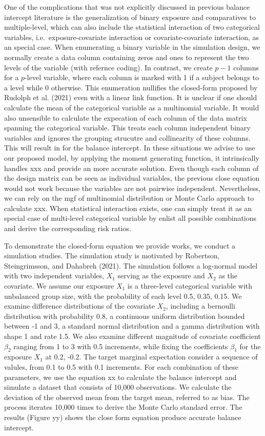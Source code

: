 \documentclass[
]{article}
\begin{document}
One of the complications that was not explicitly discussed in previous
balance intercept literature is the generalization of binary exposure
and comparatives to multiple-level, which can also include the
statistical interaction of two categorical variables,
i.e.~exposure-covariate interaction or covariate-covariate interaction,
as an special case. When enumerating a binary variable in the simulation
design, we normally create a data column containing zeros and ones to
represent the two levels of the variable (with refernce coding). In
contrast, we create \(p-1\) columns for a \(p\)-level variable, where
each column is marked with 1 if a subject belongs to a level while 0
otherwise. This enumeration nullifies the closed-form proposed by
Rudolph et al. (2021) even with a linear link function. It is unclear if
one should calculate the mean of the categorical variable as a
multinomial variable. It would also unsensible to calculate the
expecation of each column of the data matrix spanning the categorical
variable. This treats each column independent binary variables and
ignores the grouping strucutre and collinearity of these columns. This
will result in for the balance intercept. In these situations we advise
to use our proposed model, by applying the moment generating function,
it intrinsically handles xxx and provide an more accurate solution. Even
though each column of the design matrix can be seen as individual
variables, the previous close equation would not work because the
variables are not pairwise independent. Nevertheless, we can rely on the
mgf of multinomial distribution or Monte Carlo approach to calculate
xxx. When statistical interaction exists, one can simply treat it as an
special case of multi-level categorical variable by enlist all possible
combinations and derive the corresponding risk ratios.

To demonstrate the closed-form equation we provide works, we conduct a
simulation studies. The simulation study is motivated by Robertson,
Steingrimsson, and Dahabreh (2021). The simulation follows a log-normal
model with two independent variables, \(X_1\) serving as the exposure
and \(X_2\) as the covariate. We assume our exposure \(X_1\) is a
three-level categorical variable with unbalanced group size, with the
probability of each level 0.5, 0.35, 0.15. We examine difference
distributions of the covariate \(X_2\), including a bernoulli
distribution with probability 0.8, a continuous uniform distribution
bounded between -1 and 3, a standard normal distribution and a gamma
distribution with shape 1 and rate 1.5. We also examine different
magnitude of covariate coefficient \(\beta_2\) ranging from 1 to 3 with
0.5 increments, while fixing the coefficients \(\beta_1\) for the
exposure \(X_1\) at 0.2, -0.2. The target marginal expectation consider
a sequence of valules, from 0.1 to 0.5 with 0.1 increments. For each
combination of these parameters, we use the equation xx to calculate the
balance intercept and simulate a dataset that consists of 10,000
observations. We calculate the deviation of the observed mean from the
target mean, referred to as bias. The process iterates 10,000 times to
derive the Monte Carlo standard error. The results (Figure yy) shows the
close form equation produce accurate balance intercept.
\end{document}
